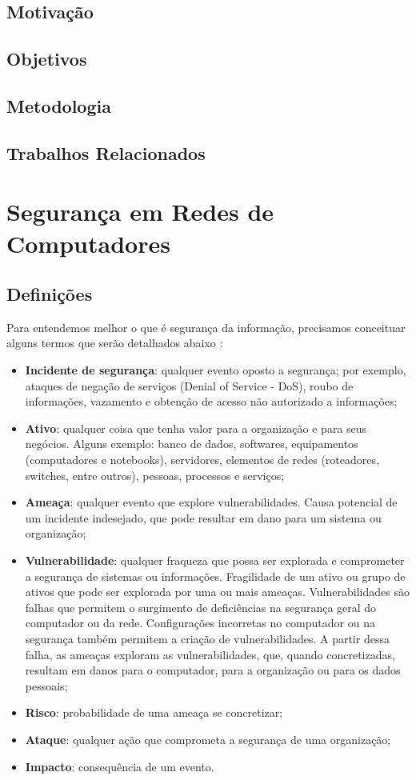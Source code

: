 \documentclass[
	12pt,				
	openright,		
	twoside,	
	a4paper,
	english,	
	brazil	
	]{abntex2}
\begin{document}
\section{Motivação} \label{sec:motivação}
\section{Objetivos} \label{sec:objetivos}
\section{Metodologia} \label{sec:metodologia}
\section{Trabalhos Relacionados} \label{sec:relacionados}
\chapter{Segurança em Redes de Computadores} \label{ch:segurança}
\section{Definições} \label{sec:definições}

Para entendemos melhor o que é segurança da informação, precisamos conceituar alguns termos que serão detalhados abaixo \cite{esr-gestao}:
\begin{itemize}
 \item \textbf{Incidente de segurança}: qualquer evento oposto a segurança; por exemplo, ataques de negação de serviços (Denial of Service - DoS), roubo de informações, vazamento e obtenção de acesso não autorizado a informações;
 \item \textbf{Ativo}: qualquer coisa que tenha valor para a organização e para seus negócios. Alguns exemplo: banco de dados, softwares, equipamentos (computadores e notebooks), servidores, elementos de redes (roteadores, switches, entre outros), pessoas, processos e serviços;
 \item \textbf{Ameaça}: qualquer evento que explore vulnerabilidades. Causa potencial de um incidente indesejado, que pode resultar em dano para um sistema ou organização;
 \item \textbf{Vulnerabilidade}: qualquer fraqueza que possa ser explorada e comprometer a segurança de sistemas ou informações. Fragilidade de um ativo ou grupo de ativos que pode ser explorada por uma ou mais ameaças. Vulnerabilidades são falhas que permitem o surgimento de deficiências na segurança geral do computador ou da rede. Configurações incorretas no computador ou na segurança também permitem a criação de vulnerabilidades. A partir dessa falha, as ameaças exploram as vulnerabilidades, que, quando concretizadas, resultam em danos para o computador, para a organização ou para os dados pessoais;
 \item \textbf{Risco}: probabilidade de uma ameaça se concretizar;
 \item \textbf{Ataque}: qualquer ação que comprometa a segurança de uma organização;
 \item \textbf{Impacto}: consequência de um evento.
\end{itemize}
\end{document}

